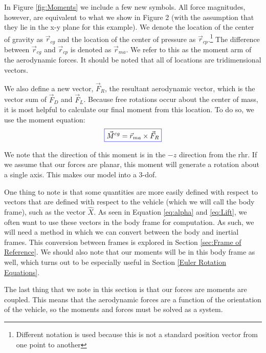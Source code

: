 \documentclass[12pt]{report}
\begin{document}
In Figure \ref{fig:Moments} we include a few new symbols. All force magnitudes, however, are equivalent to what we show in Figure 2 (with the assumption that they lie in the x-y plane for this example). We denote the location of the center of gravity as $\vec{r}_{cg}$ and the location of the center of pressure as $\vec{r}_{cp}$.\footnote{Different notation is used because this is not a standard position vector from one point to another} The difference between $\vec{r}_{cg}$ and $\vec{r}_{cp}$ is denoted as $\vec{r}_{ma}$. We refer to this as the moment arm of the aerodynamic forces. It should be noted that all of locations are tridimensional vectors. 

We also define a new vector, $\vec{F}_R$, the resultant aerodynamic vector, which is the vector sum of $\vec{F}_D$ and $\vec{F}_L$. Because free rotations occur about the center of mass, it is most helpful to calculate our final moment from this location. To do so, we use the moment equation:
\begin{gather}
    \color{blue}\boxed{\color{black}\vec{M}^{cg}=\vec{r}_{ma}\times \vec{F}_R}
\end{gather}

We note that the direction of this moment is in the $-\hat{z}$ direction from the \gls{rhr}. If we assume that our forces are planar, this moment will generate a rotation about a single axis. This makes our model into a 3-\gls{dof}.

One thing to note is that some quantities are more easily defined with respect to vectors that are defined with respect to the vehicle (which we will call the \gls{body frame}), such as the vector $\hat{X}$. As seen in Equation \eqref{eq:alpha} and \eqref{eq:Lift}, we often want to use these vectors in the \gls{body frame} for computation. As such, we will need a method in which we can convert between the body and \glspl{inertial frame}. This conversion between frames is explored in Section \ref{sec:Frame of Reference}. We should also note that our moments will be in this \gls{body frame} as well, which turns out to be especially useful in Section \ref{Euler Rotation Equations}.

The last thing that we note in this section is that our forces are moments are coupled. This means that the aerodynamic forces are a function of the orientation of the vehicle, so the moments and forces must be solved as a system.
\end{document}
